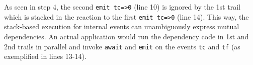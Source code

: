 \documentclass{acm_proc_article-sp}
\newcommand{\code}[1] {{\small{\texttt{#1}}}}
\newcommand{\1}{\;}
\newcommand{\2}{\;\;}
\newcommand{\3}{\;\;\;}
\newcommand{\5}{\;\;\;\;\;}
\begin{document}
%
As seen in step 4, the second \code{emit tc=>0} (line 10) is ignored by the 1st 
trail which is stacked in the reaction to the first \code{emit tc=>0} (line 
14).
%
This way, the stack-based execution for internal events can unambiguously 
express mutual dependencies.
%
%
An actual application would run the dependency code in 1st and 2nd trails in 
parallel and invoke \code{await} and \code{emit} on the events \code{tc} and 
\code{tf} (as exemplified in lines 13-14).

\end{document}

